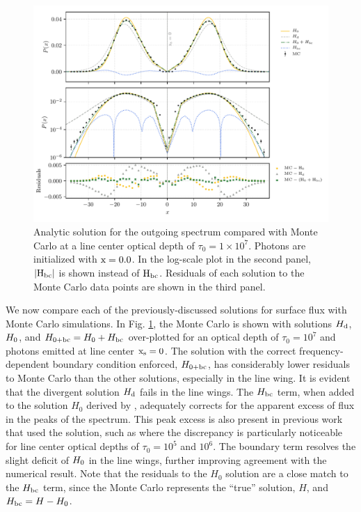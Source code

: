 \documentclass{aastex63}
\begin{document}
\begin{figure}
    \centering
    \includegraphics{final_residual.pdf}
    \caption{Analytic solution for the outgoing spectrum compared with Monte Carlo at a line center optical depth of $\tau_0 = 1 \times 10^7$. Photons are initialized with $\rm x = 0.0$. In the log-scale plot in the second panel, $|\rm H_{bc}|$ is shown instead of $\rm H_{bc}$. Residuals of each solution to the Monte Carlo data points are shown in the third panel.} 
    \label{fig:sol_mc_residual_0}
\end{figure}

We now compare each of the previously-discussed solutions for surface flux with Monte Carlo simulations. In Fig. \ref{fig:sol_mc_residual_0}, the Monte Carlo is shown with solutions $H_{\rm d}$, $H_{\rm 0}$, and $H_{\rm 0 + bc} = H_{\rm 0} + H_{\rm bc}$ over-plotted for an optical depth of $\tau_0 = 10^7$ and photons emitted at line center $\rm x_s = 0$. The solution with the correct frequency-dependent boundary condition enforced, $H_{\rm 0 + bc}$, has considerably lower residuals to Monte Carlo than the other solutions, especially in the line wing. It is evident that the divergent solution $H_{\rm d}$ fails in the line wings. The $H_{\rm bc}$ term, when added to the solution $H_0$ derived by \citet{2006ApJ...649...14D}, adequately corrects for the apparent excess of flux in the peaks of the spectrum. This peak excess is also present in previous work that used the \citet{1990ApJ...350..216N} solution, such as \citet{2015MNRAS.449.4336S} where the discrepancy is particularly noticeable for line center optical depths of $\tau_0=10^5$ and $10^6$. The boundary term resolves the slight deficit of $H_{\rm0}$ in the line wings, further improving agreement with the numerical result. Note that the residuals to the $H_0$ solution are a close match to the $H_{\rm bc}$ term, since the Monte Carlo represents the ``true'' solution, $H$, and $H_{\rm bc} = H - H_0$.
\end{document}
